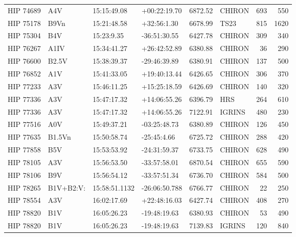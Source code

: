 \documentclass{emulateapj}
\begin{document}
\begin{longtable*}{|l|lllrlrr|}
   HIP 74689 &            A4V &    15:15:49.08 &   +00:22:19.70 &  6872.52 &     CHIRON &      693 &     550 \\
   HIP 75178 &           B9Vn &    15:21:48.58 &    +32:56:1.30 &  6678.99 &       TS23 &      815 &    1620 \\
   HIP 75304 &            B4V &     15:23:9.35 &   -36:51:30.55 &  6427.78 &     CHIRON &      309 &     340 \\
   HIP 76267 &           A1IV &    15:34:41.27 &   +26:42:52.89 &  6380.88 &     CHIRON &       36 &     290 \\
   HIP 76600 &          B2.5V &    15:38:39.37 &   -29:46:39.89 &  6380.91 &     CHIRON &      137 &     500 \\
   HIP 76852 &            A1V &    15:41:33.05 &   +19:40:13.44 &  6426.65 &     CHIRON &      306 &     370 \\
   HIP 77233 &            A3V &    15:46:11.25 &   +15:25:18.59 &  6426.69 &     CHIRON &      140 &     320 \\
   HIP 77336 &            A3V &    15:47:17.32 &   +14:06:55.26 &  6396.79 &        HRS &      264 &     610 \\
   HIP 77336 &            A3V &    15:47:17.32 &   +14:06:55.26 &  7122.91 &     IGRINS &      480 &     230 \\
   HIP 77516 &            A0V &    15:49:37.21 &   -03:25:48.73 &  6380.89 &     CHIRON &      126 &     450 \\
   HIP 77635 &         B1.5Vn &    15:50:58.74 &    -25:45:4.66 &  6725.72 &     CHIRON &      288 &     420 \\
   HIP 77858 &            B5V &    15:53:53.92 &   -24:31:59.37 &  6733.75 &     CHIRON &      628 &     490 \\
   HIP 78105 &            A3V &    15:56:53.50 &   -33:57:58.01 &  6870.54 &     CHIRON &      655 &     590 \\
   HIP 78106 &            B9V &    15:56:54.12 &   -33:57:51.34 &  6736.70 &     CHIRON &      584 &     500 \\
   HIP 78265 &      B1V+B2:V: &  15:58:51.1132 &  -26:06:50.788 &  6766.77 &     CHIRON &       22 &     250 \\
   HIP 78554 &            A3V &    16:02:17.69 &   +22:48:16.03 &  6427.74 &     CHIRON &      408 &     270 \\
   HIP 78820 &            B1V &    16:05:26.23 &   -19:48:19.63 &  6380.93 &     CHIRON &       53 &     490 \\
   HIP 78820 &            B1V &    16:05:26.23 &   -19:48:19.63 &  7139.83 &     IGRINS &      120 &     840 \\

\end{longtable*}
\end{document}
